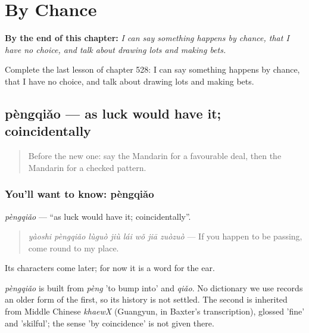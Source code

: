 
\chapter{By Chance}
\label{ch:zh-by-chance}

\begin{chapteropening}
\textbf{By the end of this chapter:} \emph{I can say something happens by chance, that I have no choice, and talk about drawing lots and making bets.}

Complete the last lesson of chapter 528: I can say something happens by chance, that I have no choice, and talk about drawing lots and making bets.
\end{chapteropening}

\section[pèngqiǎo]{pèngqiǎo — as luck would have it; coincidentally}

\label{lesson:ZH-C528-pengqiao}



\begin{quote}
Before the new one: say the Mandarin for a favourable deal, then the Mandarin for a checked pattern.
\end{quote}

\subsection*{You'll want to know: pèngqiǎo}
\emph{pèngqiǎo} — \textquotedblleft{}as luck would have it; coincidentally\textquotedblright{}.

\begin{quote}
\emph{yàoshi pèngqiǎo lùguò jiù lái wǒ jiā zuòzuò} — If you happen to be passing, come round to my place.
\end{quote}

Its characters come later; for now it is a word for the ear.

\begin{cousinweb}
\emph{pèngqiǎo} is built from \emph{pèng} 'to bump into' and \emph{qiǎo}. No dictionary we use records an older form of the first, so its history is not settled. The second is inherited from Middle Chinese \emph{khaewX} (Guangyun, in Baxter's transcription), glossed 'fine' and 'skilful'; the sense 'by coincidence' is not given there.
\end{cousinweb}

